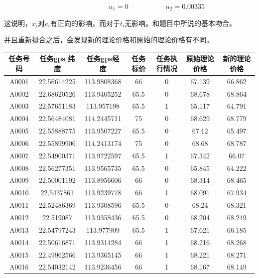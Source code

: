 \documentclass{ctexart}
\begin{document}
 \ \ \ \ \ \ \  \ \ \  \ \ \ \ \ \ \  \ \ \  \ \ \ \ \ \ \  \ \ \ $ n_{1}=0$ \ \ \ \ \ \ \  \ \ \   $ n_{2}=   0.00335$

这说明，$x_{i}$对$e_{i}$有正向的影响，而对于$t_{i}$无影响。和题目中所说的基本吻合。


并且重新拟合之后，会发现新的理论价格和原始的理论价格有不同。

  \begin{table}[!h]\center\scriptsize
\begin{tabular}{|c|c|c|c|c|c|c|}
\hline

任务号码&	任务gps 纬度	&任务gps经度&	任务标价	&任务执行情况	&原始理论价格&	新的理论价格\\
\hline
A0001&	22.56614225&	113.9808368	&66	&0	&67.139	&66.862\\
\hline
A0002&	22.68620526&	113.9405252	&65.5	&0&	68.678&	68.864\\
\hline
A0003&	22.57651183&	113.957198	&65.5	&1&	65.117&	64.791\\
\hline
A0004&	22.56484081&	114.2445711	&75	&0&	68.629&	68.779\\
\hline
A0005&	22.55888775&	113.9507227	&65.5	&0	&67.12	&65.497\\
\hline
A0006&	22.55899906&	114.2413174	&75	&0	&68.68	&68.787\\
\hline
A0007&	22.54900371&	113.9722597	&65.5	&1	&67.342	&66.07\\
\hline
A0008&	22.56277351&	113.9565735	&65.5	&0	&65.845	&64.222\\
\hline
A0009&	22.50001192&	113.8956606	&66	&0	&68.314	&68.465\\
\hline
A0010&	22.5437861&	113.9239778	&66	&1	&68.091	&67.934\\
\hline
A0011&	22.52486369&	113.9308596	&65.5&	0	&68.24&	68.321\\
\hline
A0012&	22.519087	&113.9358436	&65.5&	0	&68.204	&68.249\\
\hline
A0013&	22.54797243&	113.977909	&65.5&	1	&67.621&	66.185\\
\hline
A0014&	22.50616871&	113.9314284	&66	&1	&68.216	&68.268\\
\hline
A0015&	22.49962566	&113.9365145	&66&	1	&68.221	&68.271\\
\hline
A0016&	22.54032142	&113.9236456	&66	&1&	68.167	&68.149\\
\hline




\end{tabular}
\end{table}
\end{document}
